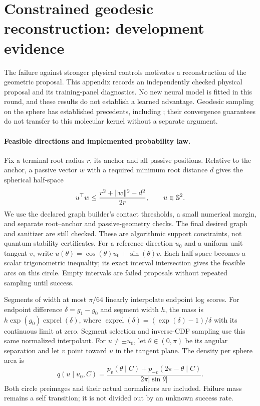 \section{Constrained geodesic reconstruction: development evidence}
\label{app:geodesic-reconstruction}

The failure against stronger physical controls motivates a reconstruction of the
geometric proposal. This appendix records an independently checked physical
proposal and its training-panel diagnostics. No new neural model is fitted in
this round, and these results do not establish a learned advantage.
Geodesic sampling on the sphere has established precedents, including
\citet{habeck2025geodesic}; their convergence guarantees do not transfer to this
molecular kernel without a separate argument.

\paragraph{Feasible directions and implemented probability law.}
Fix a terminal root radius $r$, its anchor and all passive positions. Relative
to the anchor, a passive vector $w$ with a required minimum root distance $d$
gives the spherical half-space
\begin{equation}
 u^\top w\leq\frac{r^2+\|w\|^2-d^2}{2r},\qquad u\in\mathbb S^2.
\end{equation}
We use the declared graph builder's contact thresholds, a small numerical margin,
and separate root--anchor and passive-geometry checks. The final desired graph
and sanitizer are still checked. These are algorithmic support constraints,
not quantum stability certificates.
For a reference direction $u_0$ and a uniform unit tangent $v$, write
$u(\theta)=\cos(\theta)u_0+\sin(\theta)v$.
Each half-space becomes a scalar trigonometric inequality; its exact interval
intersection gives the feasible arcs on this circle. Empty intervals are failed
proposals without repeated sampling until success.

Segments of width at most $\pi/64$ linearly interpolate endpoint log scores.
For endpoint difference $\delta=g_1-g_0$ and segment width $h$, the mass is
$h\exp(g_0)\operatorname{exprel}(\delta)$, where
$\operatorname{exprel}(\delta)=(\exp(\delta)-1)/\delta$ with its continuous limit
at zero. Segment selection and inverse-CDF sampling use this same normalized
interpolant. For $u\ne\pm u_0$, let $\theta\in(0,\pi)$ be its angular separation
and let $v$ point toward $u$ in the tangent plane. The density per sphere area is
\begin{equation}
 q(u\mid u_0,C)=
 \frac{p_v(\theta\mid C)+p_{-v}(2\pi-\theta\mid C)}
 {2\pi\lvert\sin\theta\rvert}.
\end{equation}
Both circle preimages and their actual normalizers are included. Failure mass
remains a self transition; it is not divided out by an unknown success rate.

